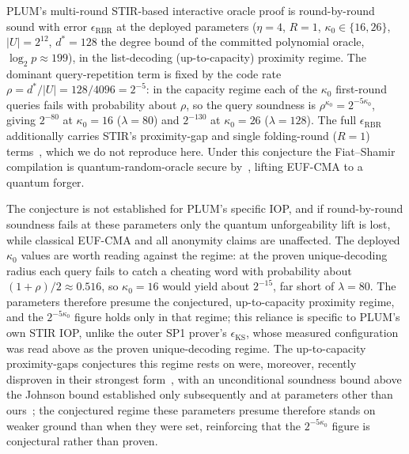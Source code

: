 \begin{conjecture}\label{conj:rbr-stir}
    PLUM's multi-round STIR-based interactive oracle proof is round-by-round sound with error $\epsilon_{\mathrm{RBR}}$ at the deployed parameters ($\eta=4$, $R=1$, $\kappa_0\in\{16,26\}$, $|U|=2^{12}$, $d^*=128$ the degree bound of the committed polynomial oracle, $\log_2 p\approx199$), in the list-decoding (up-to-capacity) proximity regime. The dominant query-repetition term is fixed by the code rate $\rho=d^*/|U|=128/4096=2^{-5}$: in the capacity regime each of the $\kappa_0$ first-round queries fails with probability about $\rho$, so the query soundness is $\rho^{\kappa_0}=2^{-5\kappa_0}$, giving $2^{-80}$ at $\kappa_0=16$ ($\lambda=80$) and $2^{-130}$ at $\kappa_0=26$ ($\lambda=128$). The full $\epsilon_{\mathrm{RBR}}$ additionally carries STIR's proximity-gap and single folding-round ($R=1$) terms~\cite{cryptoeprint:2024/390}, which we do not reproduce here. Under this conjecture the Fiat--Shamir compilation is quantum-random-oracle secure by~\cite{cryptoeprint:2019/834,cryptoeprint:2025/2166}, lifting EUF-CMA to a quantum forger.
\end{conjecture}

The conjecture is not established for PLUM's specific IOP, and if round-by-round soundness fails at these parameters only the quantum unforgeability lift is lost, while classical EUF-CMA and all anonymity claims are unaffected. The deployed $\kappa_0$ values are worth reading against the regime: at the proven unique-decoding radius each query fails to catch a cheating word with probability about $(1+\rho)/2\approx0.516$, so $\kappa_0=16$ would yield about $2^{-15}$, far short of $\lambda=80$. The parameters therefore presume the conjectured, up-to-capacity proximity regime, and the $2^{-5\kappa_0}$ figure holds only in that regime; this reliance is specific to PLUM's own STIR IOP, unlike the outer SP1 prover's $\epsilon_{\mathrm{KS}}$, whose measured configuration was read above as the proven unique-decoding regime. The up-to-capacity proximity-gaps conjectures this regime rests on were, moreover, recently disproven in their strongest form~\cite{crites2025proximitygaps}, with an unconditional soundness bound above the Johnson bound established only subsequently and at parameters other than ours~\cite{chai2026frijohnson}; the conjectured regime these parameters presume therefore stands on weaker ground than when they were set, reinforcing that the $2^{-5\kappa_0}$ figure is conjectural rather than proven.

